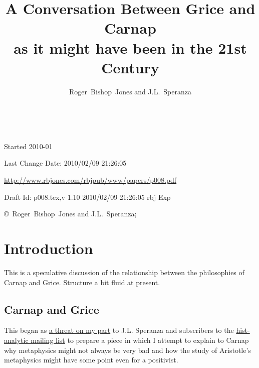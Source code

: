 \documentclass[10pt,titlepage]{book}
\title{A Conversation Between Grice and Carnap\\ {\small as it might have been in the 21st Century}}
\author{Roger~Bishop~Jones and J.L.~Speranza
}
\date{\ }
\begin{document}
\frontmatter
                               
\begin{titlepage}
\maketitle

\vfill


\vfill

\begin{centering}

\vfill

\footnotesize{
Started 2010-01

Last Change $ $Date: 2010/02/09 21:26:05 $ $

\href{http://www.rbjones.com/rbjpub/www/papers/p008.pdf}{http://www.rbjones.com/rbjpub/www/papers/p008.pdf}

Draft $ $Id: p008.tex,v 1.10 2010/02/09 21:26:05 rbj Exp $ $

\copyright\ Roger~Bishop~Jones and J.L.~Speranza;

}%
\end{centering}

\end{titlepage}

\setcounter{tocdepth}{3}
{\parskip-0pt\tableofcontents}

\mainmatter

\chapter{Introduction}

This is a speculative discussion of the relationship between the philosophies of Carnap and Grice.
Structure a bit fluid at present.

\section{Carnap and Grice}\label{CARNAPANDGRICE}

This began as \href{http://rbjones.com/pipermail/hist-analytic_rbjones.com/2009q2/000267.html}{a threat on my part} to J.L. Speranza and subscribers to the \href{http://www.hist-analytic.org/}{hist-analytic mailing list} to prepare a piece in which I attempt to explain to Carnap why metaphysics might not always be very bad and how the study of Aristotle's metaphysics might have some point even for a positivist.
\end{document}
